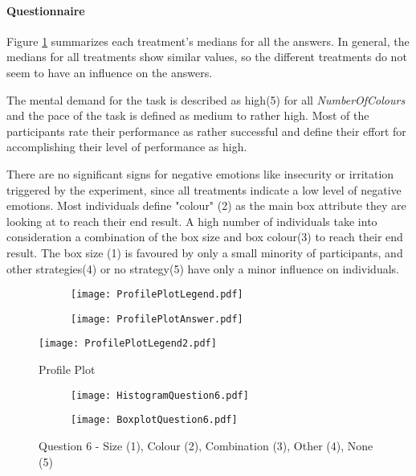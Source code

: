 \paragraph{Questionnaire}
\label{ch:Evaluation:sec:DescriptiveStatistics:subsec:Questionnaire}
Figure \ref{ProfilePlot} summarizes each treatment's medians for all the answers. In general, the medians for all treatments show similar values, so the different treatments do not seem to have an influence on the answers.

The mental demand for the task is described as high(5) for all \textit{NumberOfColours} and the pace of the task is defined as medium to rather high. Most of the participants rate their performance as rather successful and define their effort for accomplishing their level of performance as high.
 
There are no significant signs for negative emotions like insecurity or irritation triggered by the experiment, since all treatments indicate a low level of negative emotions. 
Most individuals define "colour" (2) as the main box attribute they are looking at to reach their end result. A high number of individuals take into consideration a combination of the box size and box colour(3) to reach their end result.
The box size (1) is favoured by only a small minority of participants, and other strategies(4) or no strategy(5) have only a minor influence on individuals.
 \begin{figure}[t] %
\begin{center} %
\begin{subfigure} 
\centering
 \texttt{[image: ProfilePlotLegend.pdf]}
\end{subfigure} 
\begin{subfigure}
\centering
 \texttt{[image: ProfilePlotAnswer.pdf]}
\end{subfigure}
\begin{subfigure} 
 \raggedright
 \texttt{[image: ProfilePlotLegend2.pdf]}
\end{subfigure}    
  \caption{Profile Plot}
  \label{ProfilePlot}
\end{center}
\end{figure}

\begin{figure}[htbp] %
\begin{center} 
\begin{subfigure} 
\centering
\texttt{[image: HistogramQuestion6.pdf]}
\end{subfigure} 
\begin{subfigure} 
\centering
\texttt{[image: BoxplotQuestion6.pdf]}
\end{subfigure}
  \caption[Question 6 - Histogram and Box plot]{Question 6 - Size (1), Colour (2), Combination (3), Other (4), None (5)}
    \label{Question6} 
\end{center}
\end{figure} 
\newpage
